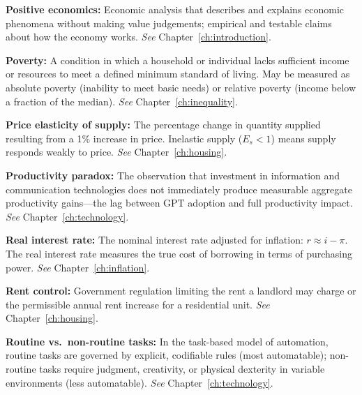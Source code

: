 \vspace{6pt}
\noindent\textbf{Positive economics:} Economic analysis that describes and explains economic phenomena without making value judgements; empirical and testable claims about how the economy works. \textit{See} Chapter~\ref{ch:introduction}.

\vspace{6pt}
\noindent\textbf{Poverty:} A condition in which a household or individual lacks sufficient income or resources to meet a defined minimum standard of living. May be measured as absolute poverty (inability to meet basic needs) or relative poverty (income below a fraction of the median). \textit{See} Chapter~\ref{ch:inequality}.

\vspace{6pt}
\noindent\textbf{Price elasticity of supply:} The percentage change in quantity supplied resulting from a 1\% increase in price. Inelastic supply ($E_s < 1$) means supply responds weakly to price. \textit{See} Chapter~\ref{ch:housing}.

\vspace{6pt}
\noindent\textbf{Productivity paradox:} The observation that investment in information and communication technologies does not immediately produce measurable aggregate productivity gains---the lag between GPT adoption and full productivity impact. \textit{See} Chapter~\ref{ch:technology}.

\vspace{6pt}
\noindent\textbf{Real interest rate:} The nominal interest rate adjusted for inflation: $r \approx i - \pi$. The real interest rate measures the true cost of borrowing in terms of purchasing power. \textit{See} Chapter~\ref{ch:inflation}.

\vspace{6pt}
\noindent\textbf{Rent control:} Government regulation limiting the rent a landlord may charge or the permissible annual rent increase for a residential unit. \textit{See} Chapter~\ref{ch:housing}.

\vspace{6pt}
\noindent\textbf{Routine vs.\ non-routine tasks:} In the task-based model of automation, routine tasks are governed by explicit, codifiable rules (most automatable); non-routine tasks require judgment, creativity, or physical dexterity in variable environments (less automatable). \textit{See} Chapter~\ref{ch:technology}.

